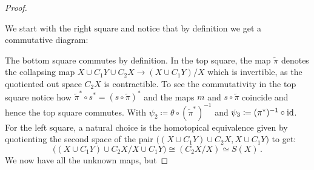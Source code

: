 \begin{proof}
\begin{fdiagram}
	\end{fdiagram}
	We start with the right square and notice that by definition we get a commutative diagram:
	\begin{center}
	\end{center}
	The bottom square commutes by definition. In the top square, the map $\tilde{\pi}$ denotes the collapsing map $X\cup C_1Y\cup C_2X\to (X\cup C_1Y)\big/X$ which is invertible, as the quotiented out space $C_2X$ is contractible. To see the commutativity in the top square notice how $\tilde{\pi}^*\circ s^*=(s\circ \tilde{\pi})^*$ and the maps $m$ and $s\circ \tilde{\pi}$ coincide and hence the top square commutes. With ${\psi}_2\coloneq \theta \circ (\tilde{\pi}^*)^{-1}$ and ${\psi}_3\coloneq (\pi^*)^{-1}\circ \operatorname{\mathrm{id}}$.
	For the left square, a natural choice is the homotopical equivalence given by quotienting the second space of the pair $\big((X\cup C_1Y)\cup C_2X,X\cup C_1Y\big)$ to get:
	\begin{equation*}
		\Big((X\cup C_1Y)\cup C_2X\Big/X\cup C_1Y\Big)\cong (C_2X\big/X)\simeq S(X)\,.
	\end{equation*} We now have all the unknown maps, but

\end{proof}
